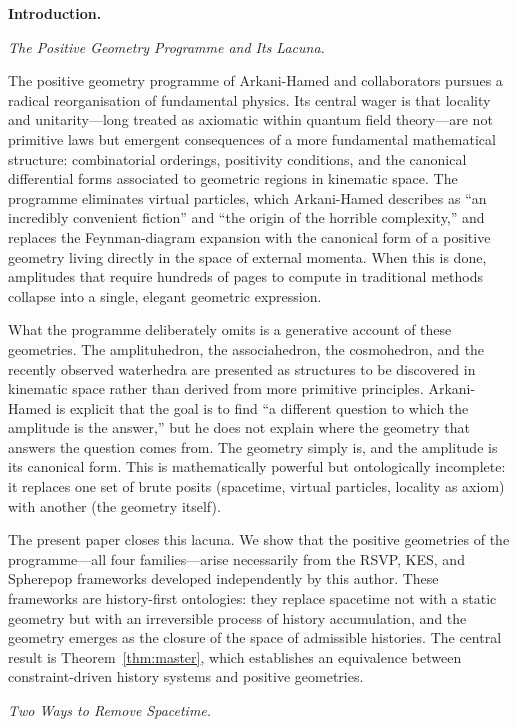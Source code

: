 \documentclass[11pt]{article}
\theoremstyle{plain}
\theoremstyle{definition}
\theoremstyle{remark}
\begin{document}
\newpage
\bigskip\noindent\textbf{Introduction.}
\label{sec:intro}

\medskip\noindent\textit{The Positive Geometry Programme and Its Lacuna.}

The positive geometry programme of Arkani-Hamed and collaborators pursues a radical reorganisation of fundamental physics. Its central wager is that locality and unitarity---long treated as axiomatic within quantum field theory---are not primitive laws but emergent consequences of a more fundamental mathematical structure: combinatorial orderings, positivity conditions, and the canonical differential forms associated to geometric regions in kinematic space. The programme eliminates virtual particles, which Arkani-Hamed describes as ``an incredibly convenient fiction'' and ``the origin of the horrible complexity,'' and replaces the Feynman-diagram expansion with the canonical form of a positive geometry living directly in the space of external momenta. When this is done, amplitudes that require hundreds of pages to compute in traditional methods collapse into a single, elegant geometric expression.

What the programme deliberately omits is a generative account of these geometries. The amplituhedron, the associahedron, the cosmohedron, and the recently observed waterhedra are presented as structures to be discovered in kinematic space rather than derived from more primitive principles. Arkani-Hamed is explicit that the goal is to find ``a different question to which the amplitude is the answer,'' but he does not explain where the geometry that answers the question comes from. The geometry simply is, and the amplitude is its canonical form. This is mathematically powerful but ontologically incomplete: it replaces one set of brute posits (spacetime, virtual particles, locality as axiom) with another (the geometry itself).

The present paper closes this lacuna. We show that the positive geometries of the programme---all four families---arise necessarily from the RSVP, KES, and Spherepop frameworks developed independently by this author. These frameworks are history-first ontologies: they replace spacetime not with a static geometry but with an irreversible process of history accumulation, and the geometry emerges as the closure of the space of admissible histories. The central result is Theorem~\ref{thm:master}, which establishes an equivalence between constraint-driven history systems and positive geometries.

\medskip\noindent\textit{Two Ways to Remove Spacetime.}
\end{document}
